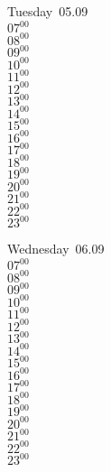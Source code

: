 \documentclass[11pt, a4paper]{book}\usepackage[]{graphicx}\usepackage[]{color}
\begin{document}
\begin{weekdaybox}
  Tuesday~05.09\\
  { 
  \vfill
  $07^{00}$\\
$08^{00}$\\
$09^{00}$\\
$10^{00}$\\
$11^{00}$\\
$12^{00}$\\
$13^{00}$\\
$14^{00}$\\
$15^{00}$\\
$16^{00}$\\
$17^{00}$\\
$18^{00}$\\
$19^{00}$\\
$20^{00}$\\
$21^{00}$\\
$22^{00}$\\
$23^{00}$\\
  }
\end{weekdaybox}
\begin{weekdaybox}
  Wednesday~06.09\\
  { 
  \vfill
  $07^{00}$\\
$08^{00}$\\
$09^{00}$\\
$10^{00}$\\
$11^{00}$\\
$12^{00}$\\
$13^{00}$\\
$14^{00}$\\
$15^{00}$\\
$16^{00}$\\
$17^{00}$\\
$18^{00}$\\
$19^{00}$\\
$20^{00}$\\
$21^{00}$\\
$22^{00}$\\
$23^{00}$\\
  }
\end{weekdaybox}
\clearpage
\begin{headerbox}
\end{headerbox}
\end{document}
